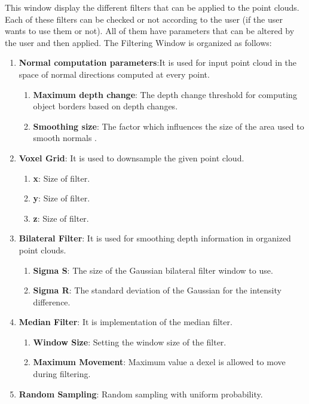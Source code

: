 \documentclass[aps,letterpaper,11pt]{revtex4}
\begin{document}
This window display the different filters that can be applied to the point clouds. Each of these filters can be checked or not according to the user (if the user wants to use them or not). All of them have parameters that can be altered by the user and then applied. The Filtering Window is organized as follows:

\begin{enumerate}
  \item \textbf{Normal computation parameters}:It is used for input point cloud in the space of normal directions computed at every point.
\begin{enumerate}
  \item \textbf{Maximum depth change}: The depth change threshold for computing object borders based on depth changes.
  \item \textbf{Smoothing size}: The factor which influences the size of the area used to smooth normals .
\end{enumerate}
 \item \textbf{Voxel Grid}: It is used to downsample the given point cloud.
\begin{enumerate}
 \item \textbf{x}: Size of filter.
 \item \textbf{y}: Size of filter.
 \item \textbf{z}: Size of filter.
\end{enumerate}
 \item \textbf{Bilateral Filter}: It is used for smoothing depth information in organized point clouds.
\begin{enumerate}
 \item \textbf{Sigma S}: The size of the Gaussian bilateral filter window to use.
 \item \textbf{Sigma R}: The standard deviation of the Gaussian for the intensity difference.
\end{enumerate}
 \item \textbf{Median Filter}: It is implementation of the median filter.
\begin{enumerate}
 \item \textbf{Window Size}: Setting the window size of the filter.
 \item \textbf{Maximum Movement}: Maximum value a dexel is allowed to move during filtering.
\end{enumerate}
 \item \textbf{Random Sampling}: Random sampling with uniform probability.
\begin{enumerate}

\end{enumerate}
\end{enumerate}
\end{document}
